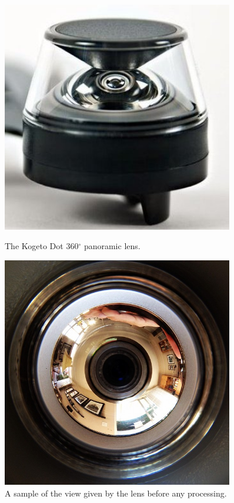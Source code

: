 \documentclass[a4paper,11pt,twoside,openright]{article}
\begin{document}
\begin{figure}[t!]
  \centering
  \begin{minipage}[t!]{0.45\textwidth}
    \centering
    \includegraphics[width=0.9\textwidth]{KogetoDot}
    \caption{The Kogeto Dot 360$^\circ$ panoramic lens.}
  \end{minipage}
  \hfill
  \begin{minipage}[t!]{0.45\textwidth}
    \centering
    \includegraphics[width=0.9\textwidth]{PanoramicView}
    \caption{A sample of the view given by the lens before any processing.}
  \end{minipage}

\end{figure}
\end{document}
